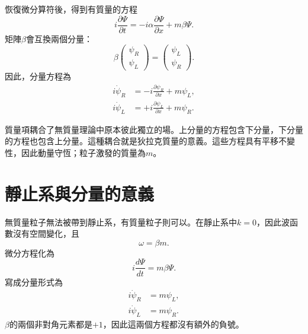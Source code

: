 恢復微分算符後，得到有質量的方程
\begin{equation}
i\frac{\partial\Psi}{\partial t}
=
-i\alpha\frac{\partial\Psi}{\partial x}
+m\beta\Psi.
\end{equation}
矩陣\(\beta\)會互換兩個分量：
\begin{equation}
\beta
\begin{pmatrix}
\psi_R\\
\psi_L
\end{pmatrix}
=
\begin{pmatrix}
\psi_L\\
\psi_R
\end{pmatrix}.
\end{equation}
因此，分量方程為
\begin{align}
i\dot{\psi}_R
&=-i\frac{\partial\psi_R}{\partial x}+m\psi_L,\\
i\dot{\psi}_L
&=+i\frac{\partial\psi_L}{\partial x}+m\psi_R.
\end{align}

質量項耦合了無質量理論中原本彼此獨立的場。上分量的方程包含下分量，下分量的方程也包含上分量。這種耦合就是狄拉克質量的意義。這些方程具有平移不變性，因此動量守恆；粒子激發的質量為\(m\)。

\begin{classroomqa}
\end{classroomqa}

\section{靜止系與分量的意義}

無質量粒子無法被帶到靜止系，有質量粒子則可以。在靜止系中\(k=0\)，因此波函數沒有空間變化，且
\begin{equation}
\omega=\beta m.
\end{equation}
微分方程化為
\begin{equation}
i\frac{d\Psi}{dt}=m\beta\Psi.
\end{equation}
寫成分量形式為
\begin{align}
i\dot{\psi}_R&=m\psi_L,\\
i\dot{\psi}_L&=m\psi_R.
\end{align}
\(\beta\)的兩個非對角元素都是\(+1\)，因此這兩個方程都沒有額外的負號。

